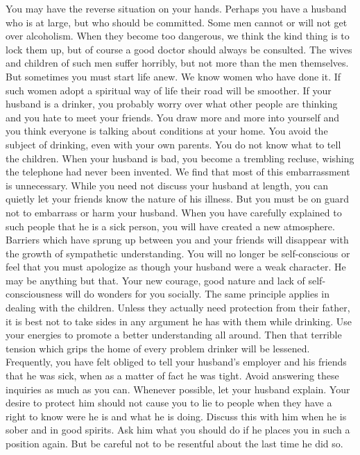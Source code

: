 \begin{biblechapter}
You may have the reverse situation on your hands.  Perhaps you have a husband who is at large, but who should be committed.  Some men cannot or will not get over alcoholism.  When they become too dangerous, we think the kind thing is to lock them up, but of course a good doctor should always be consulted.  The wives and children of such men suffer horribly, but not more than the men themselves.
But sometimes you must start life anew.  We know women who have done it.  If such women adopt a spiritual way of life their road will be smoother.
If your husband is a drinker, you probably worry over what other people are thinking and you hate to meet your friends.  You draw more and more into yourself and you think everyone is talking about conditions at your home.  You avoid the subject of drinking, even with your own parents.  You do not know what to tell the children.  When your husband is bad, you become a trembling recluse, wishing the telephone had never been invented.
We find that most of this embarrassment is unnecessary.  While you need not discuss your husband at length, you can quietly let your friends know the nature of his illness.  But you must be on guard not to embarrass or harm your husband.
When you have carefully explained to such people that he is a sick person, you will have created a new atmosphere.  Barriers which have sprung up between you and your friends will disappear with the growth of sympathetic understanding.  You will no longer be self-conscious or feel that you must apologize as though your husband were a weak character.  He may be anything but that.  Your new courage, good nature and lack of self-consciousness will do wonders for you socially.
The same principle applies in dealing with the children.  Unless they actually need protection from their father, it is best not to take sides in any argument he has with them while drinking.  Use your energies to promote a better understanding all around.  Then that terrible tension which grips the home of every problem drinker will be lessened.
Frequently, you have felt obliged to tell your husband's employer and his friends that he was sick, when as a matter of fact he was tight.  Avoid answering these inquiries as much as you can.  Whenever possible, let your husband explain.  Your desire to protect him should not cause you to lie to people when they have a right to know were he is and what he is doing.  Discuss this with him when he is sober and in good spirits.  Ask him what you should do if he places you in such a position again.  But be careful not to be resentful about the last time he did so.

\end{biblechapter}
